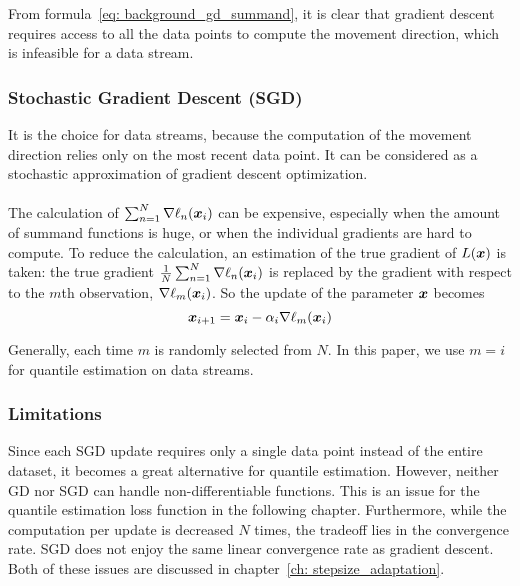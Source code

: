         From formula~\ref{eq: background_gd_summand}, it is clear that gradient descent requires access to all the data points to compute the movement direction, which is infeasible for a data stream.


    \subsubsection{Stochastic Gradient Descent (SGD)}
        It is the choice for data streams, because the computation of the movement direction relies only on the most recent data point.
        It can be considered as a stochastic approximation of gradient descent optimization.
        \\\\
        The calculation of $\sum_{n=1}^{N} \nabla \ell_n(\bm{x}_i)$ can be
        expensive, especially when the amount of summand functions is huge, or when the individual gradients are hard to
        compute.
        To reduce the calculation, an estimation of the true gradient of $L(\bm{x})$ is taken: 
        the true gradient $\frac{1}{N} \sum_{n=1}^{N} \nabla \ell_n(\bm{x}_i)$ is replaced by the gradient with respect to the $m$th observation, $\nabla \ell_m(\bm{x}_i)$. 
        So the update of the parameter $\bm{x}$ becomes%
        \begin{equation}
            \bm{x}_{i+1} = \bm{x}_i - \alpha_i \nabla \ell_m(\bm{x}_i)
            \label{eq: intro_SGD}
        \end{equation}
        
        Generally, each time $m$ is randomly selected from $N$. In this paper, we use $m = i$ for quantile estimation on data streams.

\subsubsection{Limitations}
Since each SGD update requires only a single data point instead of the entire dataset, it becomes a great alternative for quantile estimation.
However, neither GD nor SGD can handle non-differentiable functions. This is an issue for the quantile estimation loss function in the following chapter.
Furthermore, while the computation per update is decreased $N$ times, the tradeoff lies in the convergence rate. SGD does not enjoy the same linear convergence rate as gradient descent. Both of these issues are discussed in chapter~\ref{ch: stepsize_adaptation}.


